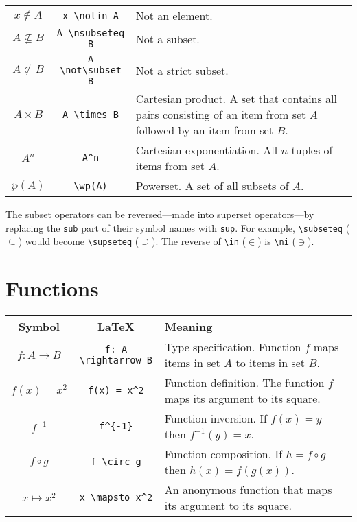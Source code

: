 \documentclass{article}
\begin{document}
\begin{tabularx}{\textwidth}{ccX}
    $x \notin A$ & \texttt{x {\textbackslash}notin A} & Not an element. \\
    $A \nsubseteq B$ & \texttt{A {\textbackslash}nsubseteq B} & Not a subset. \\
    $A \not\subset B$ & \texttt{A {\textbackslash}not{\textbackslash}subset B} & Not a strict subset. \\
    $A \times B$ & \texttt{A {\textbackslash}times B} & Cartesian product. A set that contains all pairs consisting of an item from set $A$ followed by an item from set $B$. \\
    $A^n$ & \texttt{A{\textasciicircum}n} & Cartesian exponentiation. All $n$-tuples of items from set $A$. \\
    $\wp(A)$ & \texttt{{\textbackslash}wp(A)} & Powerset. A set of all subsets of $A$.
\end{tabularx}
\vspace{2em}

The subset operators can be reversed---made into superset operators---by replacing the \texttt{sub} part of their symbol names with \texttt{sup}.
For example, \texttt{{\textbackslash}subseteq} ($\subseteq$) would become \texttt{{\textbackslash}supseteq} ($\supseteq$).
The reverse of \texttt{{\textbackslash}in} ($\in$) is \texttt{{\textbackslash}ni} ($\ni$).


\section{Functions}

\renewcommand{\arraystretch}{1.2}
\begin{tabularx}{\textwidth}{ccX}
    Symbol & \LaTeX & Meaning \\
    \hline
    $f: A \rightarrow B$ & \texttt{f:\ A {\textbackslash}rightarrow B} & Type specification. Function $f$ maps items in set $A$ to items in set $B$. \\
    $f(x) = x^2$ & \texttt{f(x) = x{\textasciicircum}2} & Function definition. The function $f$ maps its argument to its square. \\
    $f^{-1}$ & \texttt{f{\textasciicircum}\{-1\}} & Function inversion. If $f(x) = y$ then $f^{-1}(y) = x$. \\
    $f \circ g$ & \texttt{f {\textbackslash}circ g} & Function composition. If $h = f \circ g$ then $h(x) = f(g(x))$. \\
    $x \mapsto x^2$ & \texttt{x {\textbackslash}mapsto x{\textasciicircum}2} & An anonymous function that maps its argument to its square.
\end{tabularx}
\end{document}
